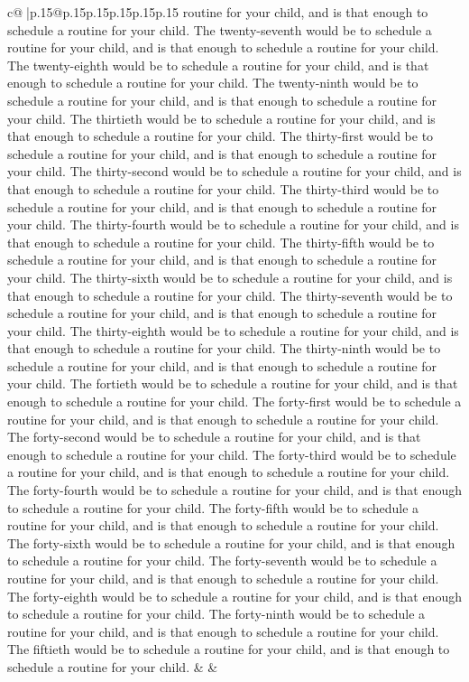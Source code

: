 \documentclass{article}
\begin{document}
{\begin{supertabular}{c@{$\;$}|p{.15\linewidth}@{}p{.15\linewidth}p{.15\linewidth}p{.15\linewidth}p{.15\linewidth}p{.15\linewidth}}
{{{routine for your child, and is that enough to schedule a routine for your child. The twenty-seventh would be to schedule a routine for your child, and is that enough to schedule a routine for your child. The twenty-eighth would be to schedule a routine for your child, and is that enough to schedule a routine for your child. The twenty-ninth would be to schedule a routine for your child, and is that enough to schedule a routine for your child. The thirtieth would be to schedule a routine for your child, and is that enough to schedule a routine for your child. The thirty-first would be to schedule a routine for your child, and is that enough to schedule a routine for your child. The thirty-second would be to schedule a routine for your child, and is that enough to schedule a routine for your child. The thirty-third would be to schedule a routine for your child, and is that enough to schedule a routine for your child. The thirty-fourth would be to schedule a routine for your child, and is that enough to schedule a routine for your child. The thirty-fifth would be to schedule a routine for your child, and is that enough to schedule a routine for your child. The thirty-sixth would be to schedule a routine for your child, and is that enough to schedule a routine for your child. The thirty-seventh would be to schedule a routine for your child, and is that enough to schedule a routine for your child. The thirty-eighth would be to schedule a routine for your child, and is that enough to schedule a routine for your child. The thirty-ninth would be to schedule a routine for your child, and is that enough to schedule a routine for your child. The fortieth would be to schedule a routine for your child, and is that enough to schedule a routine for your child. The forty-first would be to schedule a routine for your child, and is that enough to schedule a routine for your child. The forty-second would be to schedule a routine for your child, and is that enough to schedule a routine for your child. The forty-third would be to schedule a routine for your child, and is that enough to schedule a routine for your child. The forty-fourth would be to schedule a routine for your child, and is that enough to schedule a routine for your child. The forty-fifth would be to schedule a routine for your child, and is that enough to schedule a routine for your child. The forty-sixth would be to schedule a routine for your child, and is that enough to schedule a routine for your child. The forty-seventh would be to schedule a routine for your child, and is that enough to schedule a routine for your child. The forty-eighth would be to schedule a routine for your child, and is that enough to schedule a routine for your child. The forty-ninth would be to schedule a routine for your child, and is that enough to schedule a routine for your child. The fiftieth would be to schedule a routine for your child, and is that enough to schedule a routine for your child. 
	  } 
	   } 
	   } 
	 & & \\ 
 


\end{supertabular}}
\end{document}
